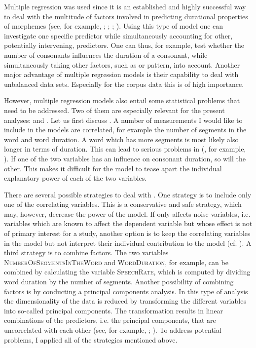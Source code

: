 Multiple regression was used since it is an established and highly successful way to deal with the multitude of factors involved in predicting durational properties of morphemes (see, for example, \citealt{Hay.2007}; \citealt{Hanique.2012}; \citealt{Smith.2012}; \citealt{Plag.2017}). Using this type of model one can investigate one specific predictor while simultaneously accounting for other, potentially intervening, predictors. One can thus, for example, test whether the number of consonants influences the duration of a consonant, while simultaneously taking other factors, such as  or  pattern, into account.  Another major advantage of multiple regression models is their capability to deal with unbalanced data sets. Especially for the corpus data this is of high importance. 

However, multiple regression models also entail some statistical problems that need to be addressed. Two of them are especially relevant for the present analyses:  and . Let us first discuss .
A number of measurements I would like to include in the models are correlated, for example the number of segments in the word and word duration. A word which has more segments is most likely also longer in terms of duration. This can lead to serious problems in  (, for example, \citealt[Chapter 6]{Baayen.2008}).  If one of the two variables has an influence on consonant duration, so will the other. This makes it difficult for the model to tease apart the individual explanatory power of each of the two variables. 

There are several possible strategies to deal with . One strategy is to include only one of the correlating variables.  This is a conservative and safe strategy, which may, however, decrease the power of the model. If  only affects noise variables, i.e. variables which are known to affect the dependent variable but whose effect is not of primary interest for a study, another option is to keep the correlating variables in the model but not interpret their individual contribution to the model (cf. \citealt{Wurm.2014}). A third strategy is to combine factors. The two variables \textsc{NumberOfSegmentsInTheWord } and \textsc{WordDuration}, for example, can be combined by calculating the variable \textsc{SpeechRate}, which is computed by dividing word duration by the number of segments. Another possibility of combining factors is by conducting a principal components analysis. In this type of analysis the dimensionality of the data is reduced by transforming the different variables into so-called principal components. The transformation results in linear combinations of the predictors, i.e. the principal components, that are uncorrelated with each other (see, for example, \citealt[Chapter 5.1]{Baayen.2008}; \citealt[Chapter 12]{Venables.2011}). To address potential  problems, I applied all of the strategies mentioned above. 


